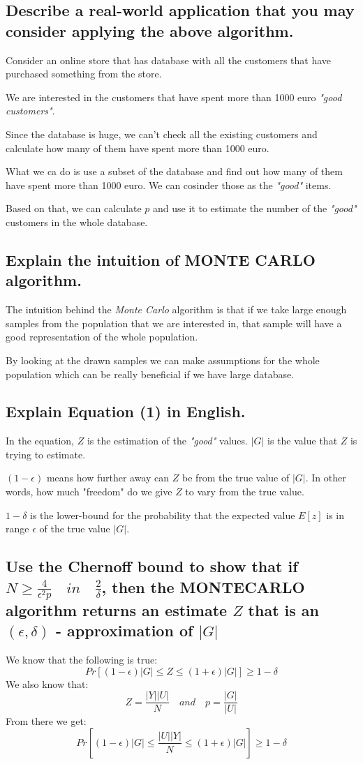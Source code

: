 \documentclass[11pt]{article}
\begin{document}
\subsection{Describe a real-world application that you may consider applying the above algorithm.}
Consider an online store that has database with all the customers that have purchased something from the store.

We are interested in the customers that have spent more than 1000 euro \textit{"good customers"}.

Since the database is huge, we can't check all the existing customers and calculate how many of them have spent more than 1000 euro.

What we ca do is use a subset of the database and find out how many of them have spent more than 1000 euro. We can cosinder those as the \textit{"good"} items.

Based on that, we can calculate $ p $ and use it to estimate the number of the \textit{"good"} customers in the whole database.


\subsection{Explain the intuition of MONTE CARLO algorithm.}
The intuition behind the \textit{Monte Carlo} algorithm is that if we take large enough samples from the population that we are interested in, that sample will have a good representation of the whole population.

By looking at the drawn samples we can make assumptions for the whole population which can be really beneficial if we have large database.



\subsection{Explain Equation (1) in English.}
In the equation, $ Z $ is the estimation of the \textit{"good"} values.
$ |G| $ is the value that $ Z $ is trying to estimate.

$ (1 - \epsilon) $ means how further away can $ Z $ be from the true value of $ |G| $. In other words, how much "freedom" do we give $ Z $ to vary from the true value.

$ 1-\delta $ is the lower-bound for the probability  that the expected value $ E[z] $ is in range $ \epsilon $ of the true value $ |G| $.



\subsection{Use the Chernoff bound to show that if $ N \geq \frac{4}{\epsilon^2p} \quad in \quad \frac{2}{\delta} $, then the MONTECARLO algorithm returns an estimate $ Z $ that is an $ (\epsilon, \delta) $ - approximation of $ |G| $}
We know that the following is true:
$$ Pr[(1-\epsilon)|G| \leq Z \leq (1+\epsilon)|G|] \geq 1-\delta $$
We also know that:
$$ Z=\frac{|Y||U|}{N} \quad and \quad p=\frac{|G|}{|U|} $$
From there we get:
$$ Pr \left[(1-\epsilon) |G| \leq \frac{|U||Y|}{N} \leq (1+\epsilon)|G| \right] \geq 1-\delta $$
\end{document}
